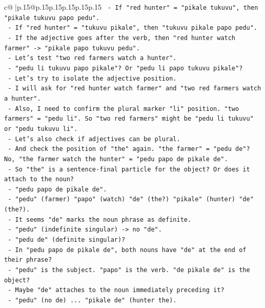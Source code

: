 \documentclass{article}
\begin{document}
{\begin{supertabular}{c@{$\;$}|p{.15\linewidth}@{}p{.15\linewidth}p{.15\linewidth}p{.15\linewidth}p{.15\linewidth}p{.15\linewidth}}
{{{\texttt{             {-} If "red hunter" = "pikale tukuvu", then "pikale tukuvu papo pedu".} \\
\texttt{             {-} If "red hunter" = "tukuvu pikale", then "tukuvu pikale papo pedu".} \\
\texttt{             {-} If the adjective goes after the verb, then "red hunter watch farmer" {-}> "pikale papo tukuvu pedu".} \\
\texttt{           {-} Let's test "two red farmers watch a hunter".} \\
\texttt{             {-} "pedu li tukuvu papo pikale"? Or "pedu li papo tukuvu pikale"?} \\
\texttt{           {-} Let's try to isolate the adjective position.} \\
\texttt{           {-} I will ask for "red hunter watch farmer" and "two red farmers watch a hunter".} \\
\texttt{           {-} Also, I need to confirm the plural marker "li" position. "two farmers" = "pedu li". So "two red farmers" might be "pedu li tukuvu" or "pedu tukuvu li".} \\
\texttt{           {-} Let's also check if adjectives can be plural.} \\
\texttt{           {-} And check the position of "the" again. "the farmer" = "pedu de"? No, "the farmer watch the hunter" = "pedu papo de pikale de".} \\
\texttt{           {-} So "the" is a sentence{-}final particle for the object? Or does it attach to the noun?} \\
\texttt{           {-} "pedu papo de pikale de".} \\
\texttt{           {-} "pedu" (farmer) "papo" (watch) "de" (the?) "pikale" (hunter) "de" (the?).} \\
\texttt{           {-} It seems "de" marks the noun phrase as definite.} \\
\texttt{           {-} "pedu" (indefinite singular) {-}> no "de".} \\
\texttt{           {-} "pedu de" (definite singular)?} \\
\texttt{           {-} In "pedu papo de pikale de", both nouns have "de" at the end of their phrase?} \\
\texttt{           {-} "pedu" is the subject. "papo" is the verb. "de pikale de" is the object?} \\
\texttt{           {-} Maybe "de" attaches to the noun immediately preceding it?} \\
\texttt{           {-} "pedu" (no de) ... "pikale de" (hunter the).} \\
}}}
\end{supertabular}}
\end{document}
